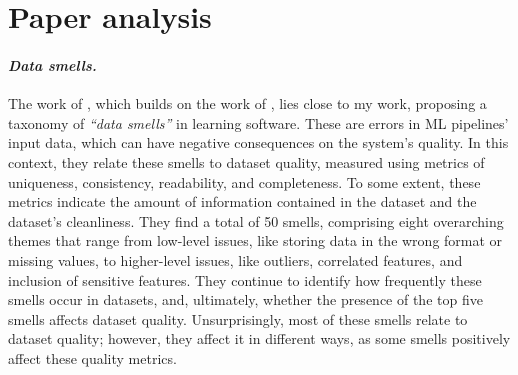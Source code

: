 \section*{Paper analysis}
    

    \paragraph{\textit{Data smells.}} The work of \citet{recupito2024unmasking}, which builds on the work of \citet{foidl2022data}, lies close to my work, proposing a taxonomy of \textit{``data smells''} in learning software.
    These are errors in ML pipelines' input data, which can have negative consequences on the system's quality.
    In this context, they relate these smells to dataset quality, measured using metrics of uniqueness, consistency, readability, and completeness.
    To some extent, these metrics indicate the amount of information contained in the dataset and the dataset's cleanliness.
    They find a total of 50 smells, comprising eight overarching themes that range from low-level issues, like storing data in the wrong format or missing values, to higher-level issues, like outliers, correlated features, and inclusion of sensitive features.
    They continue to identify how frequently these smells occur in datasets, and, ultimately, whether the presence of the top five smells affects dataset quality.
    Unsurprisingly, most of these smells relate to dataset quality; however, they affect it in different ways, as some smells positively affect these quality metrics.
    
